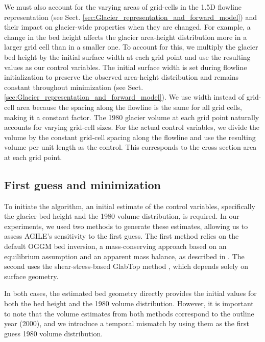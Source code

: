 \documentclass[journal abbreviation, manuscript]{copernicus}
\begin{document}
We must also account for the varying areas of grid-cells in the 1.5D flowline representation (see Sect. \ref{sec:Glacier_representation_and_forward_model}) and their impact on glacier-wide properties when they are changed. For example, a change in the bed height affects the glacier area-height distribution more in a larger grid cell than in a smaller one. To account for this, we multiply the glacier bed height by the initial surface width at each grid point and use the resulting values as our control variables. The initial surface width is set during flowline initialization to preserve the observed area-height distribution and remains constant throughout minimization (see Sect. \ref{sec:Glacier_representation_and_forward_model}). We use width instead of grid-cell area because the spacing along the flowline is the same for all grid cells, making it a constant factor. The 1980 glacier volume at each grid point naturally accounts for varying grid-cell sizes. For the actual control variables, we divide the volume by the constant grid-cell spacing along the flowline and use the resulting volume per unit length as the control. This corresponds to the cross section area at each grid point.


\subsection{First guess and minimization}
\label{sec:first_guess_method}

To initiate the algorithm, an initial estimate of the control variables, specifically the glacier bed height and the 1980 volume distribution, is required. In our experiments, we used two methods to generate these estimates, allowing us to assess AGILE’s sensitivity to the first guess. The first method relies on the default OGGM bed inversion, a mass-conserving approach based on an equilibrium assumption and an apparent mass balance, as described in \citet{Maussion2019}. The second uses the shear-stress-based GlabTop method \citep{Linsbauer2012}, which depends solely on surface geometry.

In both cases, the estimated bed geometry directly provides the initial values for both the bed height and the 1980 volume distribution. However, it is important to note that the volume estimates from both methods correspond to the outline year (2000), and we introduce a temporal mismatch by using them as the first guess 1980 volume distribution.
\end{document}
